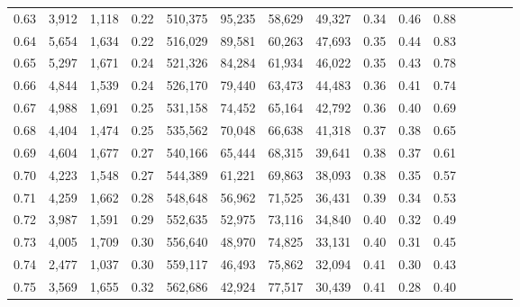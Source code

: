 \begin{tabular}{rrrcrrrrrrrrrrr}
0.63 &   3,912 &  1,118 &                                       0.22 &  510,375 &   95,235 &   58,629 &   49,327 &  0.34 &  0.46 &                         0.88 \\
0.64 &   5,654 &  1,634 &                                       0.22 &  516,029 &   89,581 &   60,263 &   47,693 &  0.35 &  0.44 &                         0.83 \\
0.65 &   5,297 &  1,671 &                                       0.24 &  521,326 &   84,284 &   61,934 &   46,022 &  0.35 &  0.43 &                         0.78 \\
0.66 &   4,844 &  1,539 &                                       0.24 &  526,170 &   79,440 &   63,473 &   44,483 &  0.36 &  0.41 &                         0.74 \\
0.67 &   4,988 &  1,691 &                                       0.25 &  531,158 &   74,452 &   65,164 &   42,792 &  0.36 &  0.40 &                         0.69 \\
0.68 &   4,404 &  1,474 &                                       0.25 &  535,562 &   70,048 &   66,638 &   41,318 &  0.37 &  0.38 &                         0.65 \\
0.69 &   4,604 &  1,677 &                                       0.27 &  540,166 &   65,444 &   68,315 &   39,641 &  0.38 &  0.37 &                         0.61 \\
0.70 &   4,223 &  1,548 &                                       0.27 &  544,389 &   61,221 &   69,863 &   38,093 &  0.38 &  0.35 &                         0.57 \\
0.71 &   4,259 &  1,662 &                                       0.28 &  548,648 &   56,962 &   71,525 &   36,431 &  0.39 &  0.34 &                         0.53 \\
0.72 &   3,987 &  1,591 &                                       0.29 &  552,635 &   52,975 &   73,116 &   34,840 &  0.40 &  0.32 &                         0.49 \\
0.73 &   4,005 &  1,709 &                                       0.30 &  556,640 &   48,970 &   74,825 &   33,131 &  0.40 &  0.31 &                         0.45 \\
0.74 &   2,477 &  1,037 &                                       0.30 &  559,117 &   46,493 &   75,862 &   32,094 &  0.41 &  0.30 &                         0.43 \\
0.75 &   3,569 &  1,655 &                                       0.32 &  562,686 &   42,924 &   77,517 &   30,439 &  0.41 &  0.28 &                         0.40 \\

\end{tabular}
